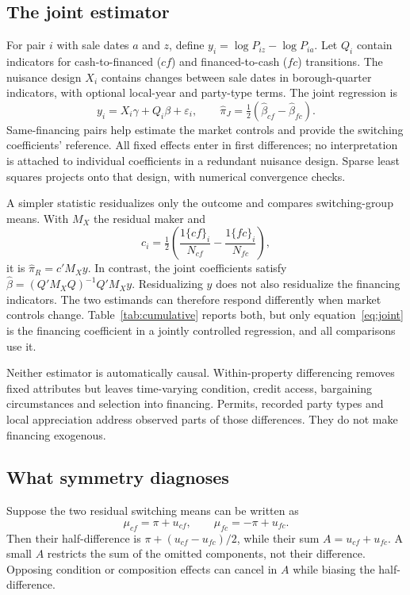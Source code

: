 \documentclass[12pt]{article}
\begin{document}
\subsection{The joint estimator}
For pair $i$ with sale dates $a$ and $z$, define $y_i=\log P_{iz}-\log P_{ia}$. Let $Q_i$ contain indicators for cash-to-financed ($cf$) and financed-to-cash ($fc$) transitions. The nuisance design $X_i$ contains changes between sale dates in borough-quarter indicators, with optional local-year and party-type terms. The joint regression is
\begin{equation}\label{eq:joint}
y_i=X_i\gamma+Q_i\beta+\varepsilon_i,\qquad
\widehat\pi_J=\tfrac12(\widehat\beta_{cf}-\widehat\beta_{fc}).
\end{equation}
Same-financing pairs help estimate the market controls and provide the switching coefficients' reference. All fixed effects enter in first differences; no interpretation is attached to individual coefficients in a redundant nuisance design. Sparse least squares projects onto that design, with numerical convergence checks.

A simpler statistic residualizes only the outcome and compares switching-group means. With $M_X$ the residual maker and
\begin{equation}
c_i=\tfrac12\left(\frac{1\{cf\}_i}{N_{cf}}-\frac{1\{fc\}_i}{N_{fc}}\right),
\end{equation}
it is $\widehat\pi_R=c'M_Xy$. In contrast, the joint coefficients satisfy $\widehat\beta=(Q'M_XQ)^{-1}Q'M_Xy$. Residualizing $y$ does not also residualize the financing indicators. The two estimands can therefore respond differently when market controls change. Table~\ref{tab:cumulative} reports both, but only equation~\eqref{eq:joint} is the financing coefficient in a jointly controlled regression, and all comparisons use it.

Neither estimator is automatically causal. Within-property differencing removes fixed attributes but leaves time-varying condition, credit access, bargaining circumstances and selection into financing. Permits, recorded party types and local appreciation address observed parts of those differences. They do not make financing exogenous.

\subsection{What symmetry diagnoses}\label{sec:sym}
Suppose the two residual switching means can be written as
\begin{equation}\label{eq:sym}
\mu_{cf}=\pi+u_{cf},\qquad \mu_{fc}=-\pi+u_{fc}.
\end{equation}
Then their half-difference is $\pi+(u_{cf}-u_{fc})/2$, while their sum $A=u_{cf}+u_{fc}$. A small $A$ restricts the sum of the omitted components, not their difference. Opposing condition or composition effects can cancel in $A$ while biasing the half-difference.
\end{document}

